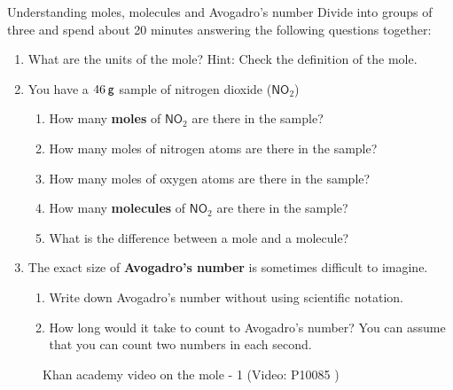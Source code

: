             \begin{groupdiscussion}{Understanding moles, molecules and Avogadro's number
      }
            \nopagebreak
      \label{m38717*id279596}Divide into groups of three and spend about 20 minutes answering the following questions together:\par 
      \label{m38717*id279603}\begin{enumerate}[noitemsep, label=\textbf{\arabic*}. ] 
            \label{m38717*uid39}\item What are the units of the mole? Hint: Check the definition of the mole.
\label{m38717*uid40}\item You have a $46\phantom{\rule{2pt}{0ex}}\mathsf{g}$ sample of nitrogen dioxide ($\mathsf{NO}_{2}$)
\label{m38717*id279631}\begin{enumerate}[noitemsep, label=\textbf{\alph*}. ] 
            \label{m38717*uid41}\item How many \textbf{moles} of $\mathsf{NO}_{2}$ are there in the sample?
\item How many moles of nitrogen atoms are there in the sample?
\item How many moles of oxygen atoms are there in the sample?
\label{m38717*uid42}\item How many \textbf{molecules} of $\mathsf{NO}_{2}$ are there in the sample?
\label{m38717*uid43}\item What is the difference between a mole and a molecule?
\end{enumerate}
        \label{m38717*uid44}\item The exact size of \textbf{Avogadro's number} is sometimes difficult to imagine.
\label{m38717*id279703}\begin{enumerate}[noitemsep, label=\textbf{\alph*}. ] 
            \label{m38717*uid45}\item Write down Avogadro's number without using scientific notation.
\label{m38717*uid46}\item How long would it take to count to Avogadro's number? You can assume that you can count two numbers in each second.
\end{enumerate}
        \end{enumerate}
\end{groupdiscussion}
\label{m38717*eip-945}
    \setcounter{subfigure}{0}
	\begin{figure}[H] %
    \textnormal{Khan academy video on the mole - 1}\vspace{.1in} \nopagebreak
  \label{m38717*yt-media2}\label{m38717*yt-video2}
             { (Video:  P10085 )}
      \vspace{2pt}
    \vspace{.1in}
 \end{figure}       \par \label{m38717*secfhsst!!!underscore!!!id850}
